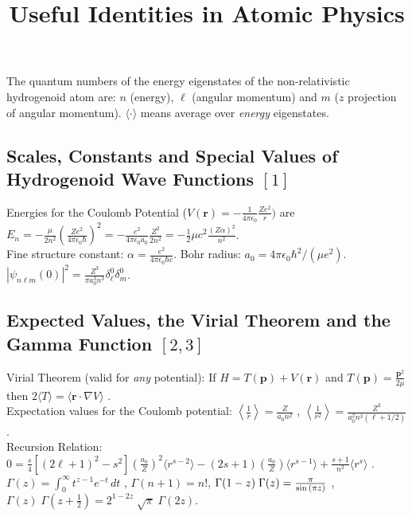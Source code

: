\documentclass[english,11pt]{shreyasnotes}
\title{Useful Identities in Atomic Physics}
\date{}
\begin{document}
\maketitle
\thispagestyle{empty}
\noindent The quantum numbers of the energy eigenstates of the non-relativistic hydrogenoid atom are: $n$ (energy), $\ell$ (angular momentum) and $m$ ($z$ projection of angular momentum). $\langle \cdot \rangle$ means average over \emph{energy} eigenstates.

\subsection*{Scales, Constants and Special Values of Hydrogenoid Wave Functions $[1]$}

Energies for the Coulomb Potential ($V(\textbf{r})=-\frac{1}{4 \pi \epsilon_0}\frac{Z e^2}{r})$ are $E_n=-\frac{\mu}{2n^2}\left( \frac{Ze^2}{4 \pi \epsilon_0 \hbar} \right)^2=-\frac{e^2}{4 \pi \epsilon_0 a_0} \frac{Z^2}{2 n^2}=-\frac{1}{2} \mu c^2 \frac{(Z \alpha)^2}{n ^2}$.\\

\noindent Fine structure constant: $\alpha=\frac{e^2}{4 \pi \epsilon_0 \hbar c}$. Bohr radius: $a_0=4 \pi \epsilon_0 \hbar^2/(\mu e^2)$. \space \space \space
$|\psi_{n \ell m}(0)|^2=\frac{Z^3}{\pi a_0^3 n^3} \delta_{\ell}^0 \delta_m^0$.

\subsection*{Expected Values, the Virial Theorem and the Gamma Function $[2,3]$}

Virial Theorem (valid for \emph{any} potential): If $H=T(\textbf{p})+V(\textbf{r})$ and $T(\textbf{p})=\frac{\textbf{p}^2}{2\mu}$ then $2\langle T \rangle=\langle \textbf{r} \cdot \nabla V \rangle$ .\\

\noindent Expectation values for the Coulomb potential: $\left\langle \frac{1}{r} \right\rangle=\frac{Z}{a_0 n^2}$ , $\left\langle \frac{1}{r^2} \right\rangle=\frac{Z^2}{a_0^2 n^3 (\ell+1/2)}$ .\\

\noindent Recursion Relation: $0=\frac{s}{4}\left[(2 \ell+1)^2-s^2 \right] \left( \frac{a_0}{Z} \right)^2 \langle r^{s-2} \rangle-(2s+1)\left(\frac{a_0}{Z} \right) \langle r^{s-1} \rangle+\frac{s+1}{n^2} \langle r^s \rangle$ .\\

\noindent $\Gamma(z) = \int_0^\infty  t^{z-1} e^{-t}\,dt $ \space , \space $\Gamma(n+1)=n!$\space , \space $ \Gamma(1-z) \; \Gamma(z) = {\pi \over \sin{(\pi z)}} \,\! $ \space , \space  $\Gamma(z) \; \Gamma\left(z + \frac{1}{2}\right) = 2^{1-2z} \; \sqrt{\pi} \; \Gamma(2z). \,\! $
\end{document}
